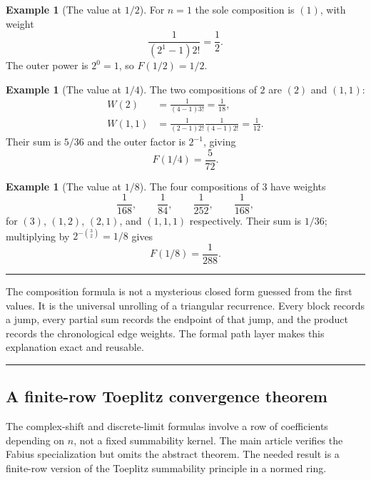 \documentclass[11pt,oneside]{article}
\theoremstyle{definition}
\newtheorem{example}[theorem]{Example}
\theoremstyle{remark}
\newenvironment{boxedremark}{%
  \par\smallskip\noindent\begin{center}\begin{minipage}{0.94\textwidth}%
  \color{black}\hrule\vspace{0.6em}\small
}{%
  \vspace{0.6em}\hrule\end{minipage}\end{center}\smallskip
}
\begin{document}
\begin{example}[The value at $1/2$]
For $n=1$ the sole composition is $(1)$, with weight
\[
 \frac1{(2^1-1)2!}=\frac12.
\]
The outer power is $2^0=1$, so $F(1/2)=1/2$.
\end{example}

\begin{example}[The value at $1/4$]
The two compositions of $2$ are $(2)$ and $(1,1)$:
\begin{align*}
 W(2)&=\frac1{(4-1)3!}=\frac1{18},\\
 W(1,1)&=\frac1{(2-1)2!}\frac1{(4-1)2!}=\frac1{12}.
\end{align*}
Their sum is $5/36$ and the outer factor is $2^{-1}$, giving
\begin{equation}
 F(1/4)=\frac5{72}.
 \label{integration:eq:F-quarter-path-check}
\end{equation}
\end{example}

\begin{example}[The value at $1/8$]
The four compositions of $3$ have weights
\begin{equation*}
 \frac1{168},\qquad
 \frac1{84},\qquad
 \frac1{252},\qquad
 \frac1{168},
\end{equation*}
for $(3)$, $(1,2)$, $(2,1)$, and $(1,1,1)$ respectively.  Their sum is $1/36$; multiplying by
$2^{-\binom32}=1/8$ gives
\begin{equation}
 F(1/8)=\frac1{288}.
 \label{integration:eq:F-eighth-path-check}
\end{equation}
\end{example}

\begin{boxedremark}
The composition formula is not a mysterious closed form guessed from the first values.  It
is the universal unrolling of a triangular recurrence.  Every block records a jump, every
partial sum records the endpoint of that jump, and the product records the chronological
edge weights.  The formal path layer makes this explanation exact and reusable.
\end{boxedremark}

\subsection{A finite-row Toeplitz convergence theorem}
\label{integration:sec:toeplitz}

The complex-shift and discrete-limit formulas involve a row of coefficients depending on
$n$, not a fixed summability kernel.  The main article verifies the Fabius specialization but
omits the abstract theorem.  The needed result is a finite-row version of the Toeplitz
summability principle in a normed ring.
\end{document}
